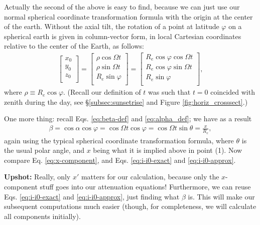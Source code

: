\documentclass[10pt]{article}
\begin{document}
Actually the second of the above is easy to find, because we can just use our normal spherical coordinate transformation formula with the origin at the center of the earth. Without the axial tilt, the rotation of a point at latitude $\varphi$ on a spherical earth is given in column-vector form, in local Cartesian coordinates relative to the center of the Earth, as follows:
\begin{align} \label{eq:noaxialtilt}
\left[ \begin{array}{ccc}
	x_0 \\
	y_0 \\
	z_0 \\
\end{array} \right] =  \left[ \begin{array}{ccc}
	\rho \cos \Omega t \\
	\rho \sin \Omega t\\
	R_e \sin \varphi \\
\end{array} \right] =  \left[ \begin{array}{ccc}
	R_e \cos \varphi \cos \Omega t \\
	R_e \cos \varphi \sin \Omega t\\
	R_e \sin \varphi \\
\end{array} \right],
\end{align}
where $\rho \equiv R_e \cos \varphi$. (Recall our definition of $t$ was such that $t=0$ coincided with zenith during the day, see \S \ref{subsec:sunsetrise} and Figure \ref{fig:horiz_crosssect}.)

\vspace{10pt}
One more thing: recall Eqs. \ref{eq:beta-def} and \ref{eq:alpha_def}; we have as a result
\begin{align} \label{eq:x-component}
\beta = \cos \alpha \cos \varphi = \cos \Omega t \cos \varphi = \cos \Omega t \sin \theta = \frac{x}{R_e},
\end{align}
again using the typical spherical coordinate transformation formula, where $\theta$ is the usual polar angle, and $x$ being what it is implied above in point (1). Now compare Eq. \eqref{eq:x-component}, and Eqs. \eqref{eq:i-i0-exact} and \eqref{eq:i-i0-approx}.

\vspace{10pt}
\textbf{Upshot:} Really, only $x'$ matters for our calculation, because only the $x$-component stuff goes into our attenuation equations! Furthermore, we can reuse Eqs. \eqref{eq:i-i0-exact} and \eqref{eq:i-i0-approx}, just finding what $\beta$ is. This will make our subsequent computations much easier (though, for completeness, we will calculate all components initially).
\end{document}
